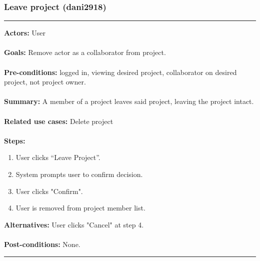 \documentclass[11pt]{report}
\begin{document}
\subsubsection{Leave project (dani2918)}
\vspace{2pt}
\hrule
\vspace{8pt}
 \textbf{Actors:} User \\ \\
\textbf{Goals:} Remove actor as a collaborator from project. \\ \\
 \textbf{Pre-conditions:} logged in, viewing desired project, collaborator on desired project, not project owner.  \\ \\
\textbf{Summary:} A member of a project leaves said project, leaving the project intact. \\ \\
\textbf{Related use cases:} Delete project \\ \\
\textbf{Steps:} \begin{enumerate}
  \item User clicks ``Leave Project''. 
  \item System prompts user to confirm decision.
  \item User clicks "Confirm".
  \item User is removed from project member list.    
 \end{enumerate}
 \textbf{Alternatives:} User clicks "Cancel" at step 4. \\ \\
 \textbf{Post-conditions:} None. \\
\vspace{8pt}
\hrule
\newpage
\end{document}
